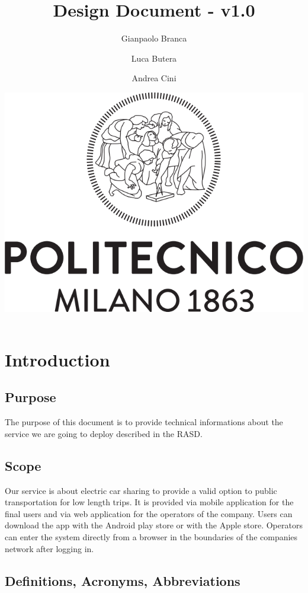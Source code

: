 \documentclass[]{article}
\title{\textbf{Design Document - v1.0}}
\author{Gianpaolo Branca \and Luca Butera \and Andrea Cini \newline}
\date{\includegraphics{polimi.png}\newpage}
\begin{document}
\maketitle

{
\setcounter{tocdepth}{3}
\tableofcontents
}
\newpage

\section{Introduction}\label{introduction}

\subsection{Purpose}\label{purpose}

The purpose of this document is to provide technical informations about
the service we are going to deploy described in the RASD.

\subsection{Scope}\label{scope}

Our service is about electric car sharing to provide a valid option to
public transportation for low length trips. It is provided via mobile
application for the final users and via web application for the
operators of the company. Users can download the app with the Android
play store or with the Apple store. Operators can enter the system
directly from a browser in the boundaries of the companies network after
logging in.

\subsection{Definitions, Acronyms,
Abbreviations}\label{definitions-acronyms-abbreviations}
\end{document}
